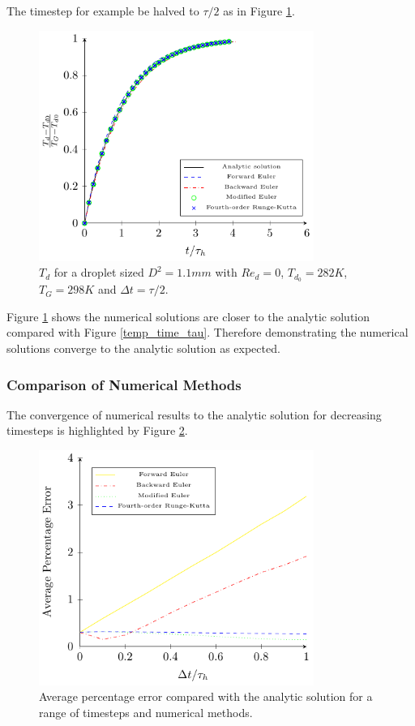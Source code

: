 \documentclass[../Interim_Report_Master]{subfiles}
\begin{document}
The timestep for example be halved to $\tau/2$ as in Figure \ref{temp_time_tau_2}.
\begin{figure}[H]
	\centering
	\includegraphics[width=0.8\textwidth]{./Diagrams/Uncoupled_Heat_Transfer_tau_2/Uncoupled_Heat_Transfer_tau_2.pdf}
	\caption{$T_d$ for a droplet sized $D^2=1.1mm$ with $Re_d=0$, $T_{d_0}=282K$, $T_G=298K$ and $\Delta t=\tau/2$.}
	\label{temp_time_tau_2}
\end{figure}

Figure \ref{temp_time_tau_2} shows the numerical solutions are closer to the analytic solution compared with Figure \ref{temp_time_tau}. Therefore demonstrating the numerical solutions converge to the analytic solution as expected. 

\newpage

\subsubsection{Comparison of Numerical Methods}
The convergence of numerical results to the analytic solution for decreasing timesteps is highlighted by Figure \ref{uc_temp_convergence}.
\begin{figure}[H]
	\centering
	\includegraphics[width=0.8\textwidth]{./Diagrams/Uncoupled_Temp_Convergence/Uncoupled_Temp_Convergence.pdf}
	\caption{Average percentage error compared with the analytic solution for a range of timesteps and numerical methods.}
	\label{uc_temp_convergence}
\end{figure}
\end{document}

